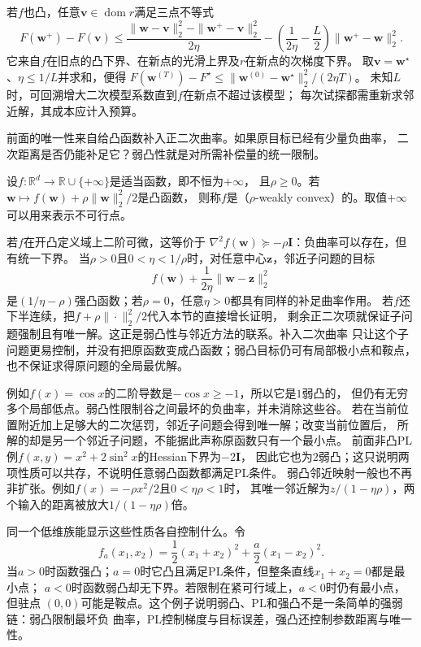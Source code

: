 若$f$也凸，任意$\bm v\in\operatorname{dom}r$满足三点不等式
\[
 F(\bm w^+)-F(\bm v)
 \leq\frac{\|\bm w-\bm v\|_2^2-\|\bm w^+-\bm v\|_2^2}{2\eta}
 -\left(\frac1{2\eta}-\frac L2\right)\|\bm w^+-\bm w\|_2^2.
\]
它来自$f$在旧点的凸下界、在新点的光滑上界及$r$在新点的次梯度下界。
取$\bm v=\bm w^\star$、$\eta\leq1/L$并求和，便得
$F(\bm w^{(T)})-F^\star\leq\|\bm w^{(0)}-\bm w^\star\|_2^2/(2\eta T)$。
未知$L$时，可回溯增大二次模型系数直到$f$在新点不超过该模型；
每次试探都需重新求邻近解，其成本应计入预算。

前面的唯一性来自给凸函数补入正二次曲率。如果原目标已经有少量负曲率，
二次距离是否仍能补足它？弱凸性就是对所需补偿量的统一限制。
\begin{definition}[欧氏空间中的弱凸性]
\label{def:opt-weak-convexity}
设$f:\mathbb{R}^d\to\mathbb{R}\cup\{+\infty\}$是适当函数，即不恒为$+\infty$，
且$\rho\geq0$。若
$\bm{w}\mapsto f(\bm{w})+\rho\lVert\bm{w}\rVert_2^2/2$是凸函数，
则称$f$是（$\rho$-weakly convex）的。取值$+\infty$可以用来表示不可行点。
\end{definition}
若$f$在开凸定义域上二阶可微，这等价于
$\nabla^2f(\bm{w})\succeq-\rho\bm{I}$：负曲率可以存在，但有统一下界。
当$\rho>0$且$0<\eta<1/\rho$时，对任意中心$\bm{z}$，邻近子问题的目标
\[
  f(\bm{w})+\frac{1}{2\eta}\lVert\bm{w}-\bm{z}\rVert_2^2
\]
是$(1/\eta-\rho)$强凸函数；若$\rho=0$，任意$\eta>0$都具有同样的补足曲率作用。
若$f$还下半连续，把$f+\rho\|\cdot\|_2^2/2$代入本节的直接增长证明，
剩余正二次项就保证子问题强制且有唯一解。这正是弱凸性与邻近方法的联系。补入二次曲率
只让这个子问题更易控制，并没有把原函数变成凸函数；弱凸目标仍可有局部极小点和鞍点，
也不保证求得原问题的全局最优解。

例如$f(x)=\cos x$的二阶导数是$-\cos x\geq-1$，所以它是$1$弱凸的，
但仍有无穷多个局部低点。弱凸性限制谷之间最坏的负曲率，并未消除这些谷。
若在当前位置附近加上足够大的二次惩罚，邻近子问题会得到唯一解；改变当前位置后，
所解的却是另一个邻近子问题，不能据此声称原函数只有一个最小点。
前面非凸PL例$f(x,y)=x^2+2\sin^2x$的Hessian下界为$-2\bm I$，
因此它也为$2$弱凸；这只说明两项性质可以共存，不说明任意弱凸函数都满足PL条件。
弱凸邻近映射一般也不再非扩张。例如$f(x)=-\rho x^2/2$且$0<\eta\rho<1$时，
其唯一邻近解为$z/(1-\eta\rho)$，两个输入的距离被放大$1/(1-\eta\rho)$倍。

同一个低维族能显示这些性质各自控制什么。令
\[
  f_a(x_1,x_2)=\frac12(x_1+x_2)^2+\frac{a}{2}(x_1-x_2)^2.
\]
当$a>0$时函数强凸；$a=0$时它凸且满足PL条件，但整条直线$x_1+x_2=0$都是最小点；
$a<0$时函数弱凸却无下界。若限制在紧可行域上，$a<0$时仍有最小点，但驻点
$(0,0)$可能是鞍点。这个例子说明弱凸、PL和强凸不是一条简单的强弱链：弱凸限制最坏负
曲率，PL控制梯度与目标误差，强凸还控制参数距离与唯一性。

